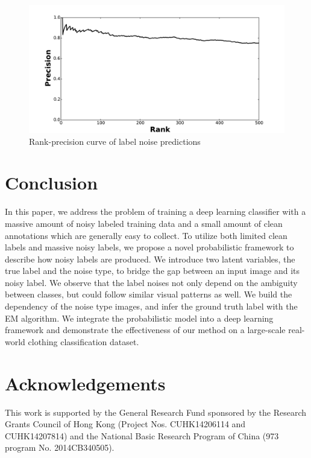 \documentclass[10pt,twocolumn,letterpaper]{article}
\begin{document}
\begin{figure}[t]
\begin{center}
\includegraphics[width=1.0\linewidth]{figure/noise_prediction_rank_precision.pdf}
\end{center}
\caption{Rank-precision curve of label noise predictions}
\label{fig:noise_prediction_rp}
\end{figure}

\section{Conclusion} %
\label{sec:conclusion}
In this paper, we address the problem of training a deep learning classifier with a massive amount of noisy labeled training data and a small amount of clean annotations which are generally easy to collect. To utilize both limited clean labels and massive noisy labels, we propose a novel probabilistic framework to describe how noisy labels are produced. We introduce two latent variables, the true label and the noise type, to bridge the gap between an input image and its noisy label. We observe that the label noises not only depend on the ambiguity between classes, but could follow similar visual patterns as well. We build the dependency of the noise type \wrt images, and infer the ground truth label with the EM algorithm. We integrate the probabilistic model into a deep learning framework and demonstrate the effectiveness of our method on a large-scale real-world clothing classification dataset.

\section*{Acknowledgements}
\label{sec:acknowledgements}
This work is supported by the General Research Fund sponsored by the Research Grants Council of Hong Kong (Project Nos. CUHK14206114 and CUHK14207814) and the National Basic Research Program of China (973 program No. 2014CB340505).


{\small


}
\end{document}
